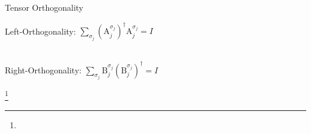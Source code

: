\documentclass{beamer}
\newcommand{\romanL}[1]{\boldsymbol{\mathrm{#1}}}
\newcommand\blfootnote[1]{%
  \begingroup
  \renewcommand\thefootnote{}\footnote{#1}%
  \addtocounter{footnote}{-1}%
  \endgroup
}
\begin{document}
\begin{frame}{Tensor Orthogonality}
\begin{minipage}{0.45\textwidth}
        Left-Orthogonality: $\sum_{\sigma_j}(\romanL{A}_j^{\sigma_j})^{\dag}\romanL{A}_j^{\sigma_j} = I$
    \end{minipage}
    \hfill
    \begin{minipage}{0.45\textwidth}
        \centering
        \\
        \vspace{0.3em}
        Right-Orthogonality: $\sum_{\sigma_j}\romanL{B}_j^{\sigma_j}(\romanL{B}_j^{\sigma_j})^{\dag} = I$
    \end{minipage}
    \blfootnote{}
\end{frame}
\end{document}
